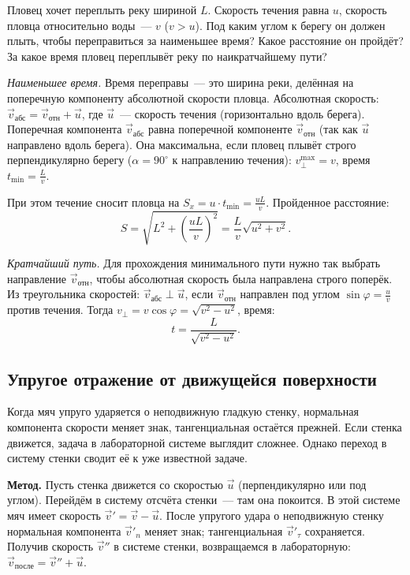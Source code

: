 \documentclass[../main.tex]{subfiles}
\begin{document}
\begin{example}
Пловец хочет переплыть реку шириной $L$.
Скорость течения равна $u$, скорость пловца относительно воды~--- $v$ ($v > u$).
Под каким углом к берегу он должен плыть, чтобы переправиться
за наименьшее время? Какое расстояние он пройдёт?
За какое время пловец переплывёт реку по наикратчайшему пути?

\noindent\textit{Наименьшее время.}
Время переправы~--- это ширина реки, делённая на поперечную
компоненту абсолютной скорости пловца.
Абсолютная скорость: $\vec{v}_{\text{абс}} = \vec{v}_{\text{отн}} + \vec{u}$,
где $\vec{u}$~--- скорость течения (горизонтально вдоль берега).
Поперечная компонента $\vec{v}_{\text{абс}}$ равна поперечной компоненте
$\vec{v}_{\text{отн}}$ (так как $\vec{u}$ направлено вдоль берега).
Она максимальна, если пловец плывёт строго перпендикулярно
берегу ($\alpha = 90^\circ$ к направлению течения):
$v_\perp^{\max} = v$, время $t_{\min} = \frac{L}{v}$.

При этом течение сносит пловца на $S_x = u \cdot t_{\min} = \frac{uL}{v}$.
Пройденное расстояние: 
\[
    S = \sqrt{L^2 + \left(\frac{uL}{v}\right)^2} = \frac{L}{v}\sqrt{u^2+v^2}.
\]

\noindent\textit{Кратчайший путь.}
Для прохождения минимального пути нужно так выбрать направление
$\vec{v}_{\text{отн}}$, чтобы абсолютная скорость была направлена
строго поперёк. Из треугольника скоростей: $\vec{v}_{\text{абс}} \perp \vec{u}$,
если $\vec{v}_{\text{отн}}$ направлен под углом $\sin\varphi = \frac{u}{v}$
против течения. Тогда $v_\perp = v\cos\varphi = \sqrt{v^2 - u^2}$, время:
\[
    t = \frac{L}{\sqrt{v^2 - u^2}}.
\]
\end{example}

\subsection{Упругое отражение от движущейся поверхности}

Когда мяч упруго ударяется о неподвижную гладкую стенку, нормальная
компонента скорости меняет знак, тангенциальная остаётся прежней.
Если стенка движется, задача в лабораторной системе выглядит сложнее.
Однако переход в систему стенки сводит её к уже известной задаче.

\noindent\textbf{Метод.}
Пусть стенка движется со скоростью $\vec{u}$ (перпендикулярно или
под углом). Перейдём в систему отсчёта стенки~--- там она покоится.
В этой системе мяч имеет скорость $\vec{v}' = \vec{v} - \vec{u}$.
После упругого удара о неподвижную стенку нормальная компонента
$\vec{v}'_n$ меняет знак; тангенциальная $\vec{v}'_\tau$ сохраняется.
Получив скорость $\vec{v}''$ в системе стенки, возвращаемся в
лабораторную: $\vec{v}_{\text{после}} = \vec{v}'' + \vec{u}$.
\end{document}

